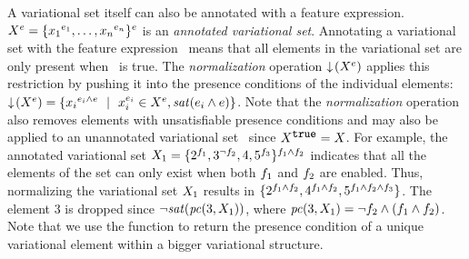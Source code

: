 A variational set itself can also be annotated with a feature expression.
%
$\annot \vset = \setDef {\annot [\dimMeta_1] {\elem_1},\ldots,\annot [\dimMeta_n] {\elem_n}}^\dimMeta$ is an
\emph{annotated variational set}.
Annotating a variational set with the feature expression \dimMeta\ means that all
elements in the variational set are only present when \dimMeta\ is true.
The \emph{normalization} operation $\pushIn {\annot \vset}$ applies this
restriction by pushing it into the presence conditions of the individual
elements:
\ensuremath{
\pushIn {\annot \vset}
= 
\setDef{\annot [\dimMeta_i \wedge \dimMeta] {\elem_i} \myOR 
\annot [\dimMeta_i] \elem_i \in \annot \vset, \sat {\dimMeta_i \wedge \dimMeta}
}
}.
Note that the \emph{normalization} operation also removes elements
with unsatisfiable presence conditions and may also be applied
to an unannotated variational set \vset\ since $\annot[\t]{\vset} = \vset$.
%
For example, the annotated variational set
$\vset_1 = \{\annot [\A] 2, \annot [\neg \B] 3, 4, \annot [\C] 5\}^{\A \wedge \B}$
indicates that all the elements of the set can only exist
when both $\A$ and $\B$ are enabled. Thus, normalizing the variational set $\vset_1$
results in
$\{\annot [\A \wedge \B] 2,\annot [\A \wedge \B] 4,\annot [\A \wedge \B \wedge \C] 5\}$. The element $3$ is dropped 
since 
\ensuremath{\neg \sat {\getPCfrom 3 {\vset_1} }},
where
\ensuremath{
{\getPCfrom 3 {\vset_1} } = \neg \B \wedge (\A \wedge \B)}.
Note that we use the function \getPCfrom \elem {\annot \vset} to 
return the presence condition of a unique variational element within a bigger
variational structure.

